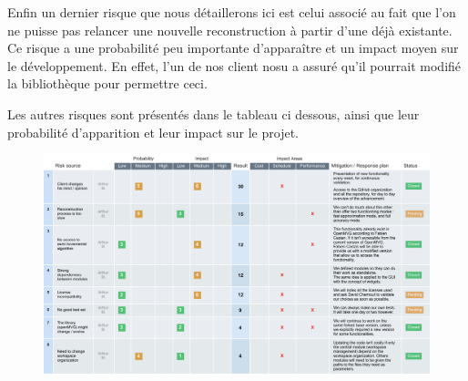 	Enfin un dernier risque que nous détaillerons ici est celui associé au fait que l'on ne puisse pas relancer une nouvelle reconstruction
à partir d'une déjà existante. Ce risque a une probabilité peu importante d'apparaître et un impact moyen sur le développement. En effet,
l'un de nos client nosu a assuré qu'il pourrait modifié la bibliothèque pour permettre ceci.


	Les autres risques sont présentés dans le tableau ci dessous, ainsi que leur probabilité d'apparition et leur impact sur le projet. 

\begin{figure}
\includegraphics[scale=0.48]{risques.png}
\end{figure}	

